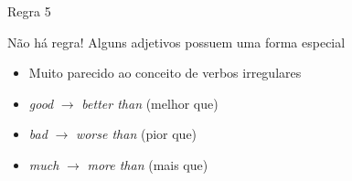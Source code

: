 \documentclass[compress,mathserif]{beamer}
\begin{document}
\begin{frame}{Regra 5}

Não há regra! Alguns adjetivos possuem uma forma especial
\begin{itemize}
    \item Muito parecido ao conceito de verbos irregulares
\end{itemize}

\vspace{0.5cm}

\begin{itemize}
    \item \textit{good} $\rightarrow$ \textit{better than} (melhor que)
    \item \textit{bad} $\rightarrow$ \textit{worse than} (pior que)
    \item \textit{much} $\rightarrow$ \textit{more than} (mais que)
\end{itemize}

\end{frame}
\end{document}
